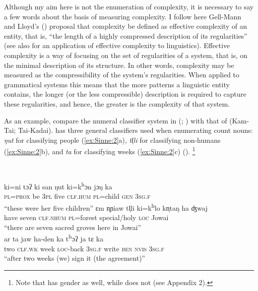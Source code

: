 \documentclass[output=collectionpaper]{langsci/langscibook}
\begin{document}
Although my aim here is not the enumeration of complexity, it is necessary to say a few words about the basis of measuring complexity. I follow here Gell-Mann and Lloyd's (\citealt*[387]{Gell-Mann2004}) proposal that complexity be defined as effective complexity of an entity, that is, ``the length of a highly compressed description of its regularities'' (see also \citealt{Dahl2004} for an application of effective complexity to linguistics). Effective complexity is a way of focusing on the set of regularities of a system, that is, on the minimal description of its structure. In other words, complexity may be measured as the compressibility of the system's regularities. When applied to grammatical systems this means that the more patterns a linguistic entity contains, the longer (or the less compressible) description is required to capture these regularities, and hence, the greater is the complexity of that system.

As an example, compare the numeral classifier system in  (; ) with that of  (Kam-Tai; Tai-Kadai).  has three general classifiers used when enumerating count nouns: \textit{ŋut} for classifying people (\ref{ex:Sinne:2}a), \textit{tl̩li} for classifying non-humans (\ref{ex:Sinne:2}b), and \textit{ta} for classifying weeks (\ref{ex:Sinne:2}c) (\citealt[124--125, 361--362]{Ring2015}).%
\footnote{Note that  has gender as well, while  does not (see Appendix 2).
} %

\ea
\label{ex:Sinne:2}
\\
\begin{xlist}
\ex
\gll ki=ni  tɔʔ ki san ŋut ki=k\textsuperscript{h}ɔn jɔŋ ka\\
\textsc{pl=prox} be \textsc{3pl} five \textsc{clf.hum} \textsc{pl}=child \textsc{gen} \textsc{3sg.f}\\
\glt ``these were her five children''
\ex
\gll ɛm n̩ɲiaw tl̩li ki=k\textsuperscript{h}lo kn̩taŋ ha ʤwaj\\
have seven \textsc{clf.nhum} \textsc{pl}=forest special/holy \textsc{loc} Jowai\\
\glt ``there are seven sacred groves here in Jowai''\\
\ex
\gll ar ta jaw ha-den ka t\textsuperscript{h}ɔʔ ja tɛ ka\\
two \textsc{clf.wk} week \textsc{loc}{}-back \textsc{3sg.f} write \textsc{ben} \textsc{nvis} \textsc{3sg.f}\\
\glt  ``after two weeks (we) sign it (the agreement)''\\
\end{xlist}
\z
\end{document}

